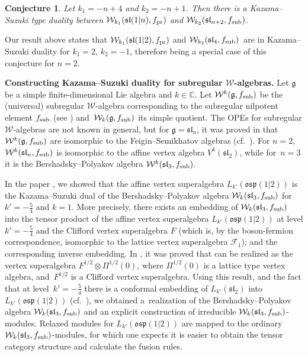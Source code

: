 \documentclass[pdftex]{sigma}
\numberwithin{equation}{section}
\newcommand{\F}{\mathcal F}
\newtheorem{conj}[Theorem]{Conjecture}
\begin{document}
\begin{conj}Let $k_1 = -n+4$ and $k_2=-n+1$. Then there is a Kazama--Suzuki type duality between
$\mathcal W_{k_1} (\mathfrak{sl}(1\vert n), f_{\rm pr})$ and $\mathcal W_{k_2} (\mathfrak{sl}_{n+2}, f_{\rm sub})$.
\end{conj}


Our result above states that $\mathcal W_{k_1} (\mathfrak{sl}(1\vert 2), f_{\rm pr})$ and $\mathcal W_{k_2}(\mathfrak{sl}_4, f_{\rm sub})$ are in Kazama--Suzuki duality for $k_1= 2$, $k_2= - 1$, therefore being a special case of this conjecture for $n=2$.


{\bf Constructing Kazama--Suzuki duality for subregular $\boldsymbol{\mathcal{W}}$-algebras.} Let $\mathfrak{g}$ be a simple finite-dimensional Lie algebra and $k \in \mathbb{C}$. Let $\mathcal{W}^k(\mathfrak{g}, f_{\rm sub})$ be the (universal) subregular $\mathcal{W}$-algebra corresponding to the subregular nilpotent element $f_{\rm sub}$ (see \cite{KW}) and~$\mathcal{W}_k(\mathfrak{g}, f_{\rm sub})$ its simple quotient. The OPEs for subregular $\mathcal{W}$-algebras are not known in general, but for $\mathfrak g = \mathfrak{sl}_n$, it was proved in \cite{Gen} that $\mathcal{W}^k(\mathfrak{g}, f_{\rm sub})$ are isomorphic to the Feigin--Semikhatov algebras  (cf.~\cite{FS}). For $n=2$, $\mathcal{W}^k(\mathfrak{sl}_n, f_{\rm sub})$ is isomorphic to the affine vertex algebra $V^k(\mathfrak{sl}_2)$, while for~${n=3}$ it is the Bershadsky--Polyakov algebra $\mathcal{W}^k(\mathfrak{sl}_3, f_{\rm sub})$.

 In the paper \cite{AK-2022}, we showed that the affine vertex {super}algebra $L_{k'} (\mathfrak{osp}(1 \vert 2))$ is the Kazama--Suzuki dual of the Bershadsky--Polyakov algebra $\mathcal{W}_k(\mathfrak{sl}_3, f_{\rm sub})$ for $k'=-\frac 54$ and $k=1$.
 More precisely, there exists an embedding of $\mathcal{W}_k(\mathfrak{sl}_3, f_{\rm sub})$ into the tensor product of the affine vertex {super}algebra $L_{k'} (\mathfrak{osp}(1 \vert 2))$ at level $k'=-\frac 54$ and the Clifford vertex {super}algebra $F$ (which is, by the boson-fermion correspondence, isomorphic to the lattice vertex superalgebra $\F_1$); and the corresponding inverse embedding.
 In \cite{A-2019}, it was proved that  can be realized as the vertex {super}algebra $F^{1/2} \otimes \Pi^{1/2}(0)$, where $\Pi^{1/2}(0)$ is a lattice type vertex algebra, and~$F^{1/2}$ is a Clifford vertex {super}algebra.
 Using this result, and the fact that at level~${k'=-\frac 54}$ there is a conformal embedding of $L_{k'}(\mathfrak{sl}_2)$ into $L_{k'}(\mathfrak{osp}(1 \vert 2))$ (cf.\ \cite{AKMPP-2020}),
we obtained a~realization of the Bershadsky--Polyakov algebra $\mathcal{W}_k(\mathfrak{sl}_3, f_{\rm sub})$ and an explicit construction of irreducible $\mathcal{W}_k(\mathfrak{sl}_3, f_{\rm sub})$-modules.
Relaxed modules for $L_{k'}(\mathfrak{osp}(1 \vert 2))$ are mapped to the ordinary~${\mathcal{W}_k(\mathfrak{sl}_3, f_{\rm sub})}$-modules, for which one expects it is easier to obtain the tensor category structure and calculate the fusion rules.
\end{document}
